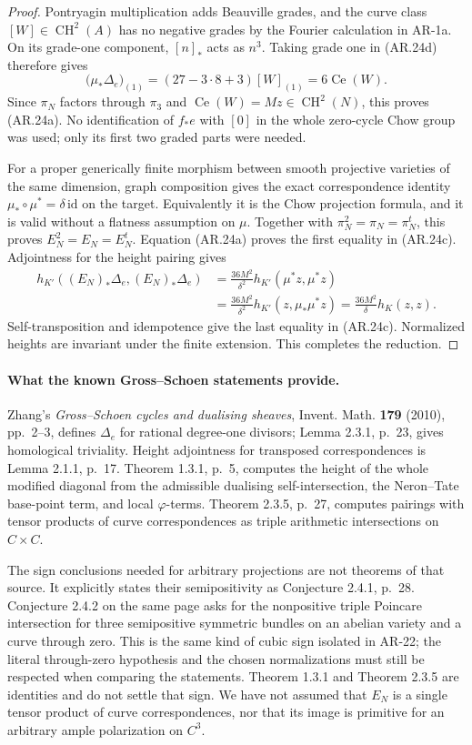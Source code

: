 \documentclass[11pt,a4paper]{article}
\begin{document}
\begin{proof}
Pontryagin multiplication adds Beauville grades, and the curve
class $[W]\in\operatorname{CH}^2(A)$ has no negative grades by
the Fourier calculation in AR-1a.  On its grade-one component,
$[n]_*$ acts as $n^3$.  Taking grade one in (AR.24d) therefore
gives
\[
 \bigl(\mu_*\Delta_e\bigr)_{(1)}
       =(27-3\cdot8+3)[W]_{(1)}=6\operatorname{Ce}(W).
\]
Since $\pi_N$ factors through $\pi_3$ and
$\operatorname{Ce}(W)=Mz\in\operatorname{CH}^2(N)$, this proves
(AR.24a).  No identification of $f_*e$ with $[0]$ in the whole
zero-cycle Chow group was used; only its first two graded parts
were needed.

For a proper generically finite morphism between smooth projective
varieties of the same dimension, graph composition gives the exact
correspondence identity
$\mu_*\circ\mu^*=\delta\,\mathrm{id}$ on the target.  Equivalently
it is the Chow projection formula, and it is valid without a
flatness assumption on $\mu$.  Together with
$\pi_N^2=\pi_N=\pi_N^t$, this proves
$E_N^2=E_N=E_N^t$.  Equation (AR.24a) proves the first equality in
(AR.24c).  Adjointness for the height pairing gives
\[
 \begin{split}
 h_{K'}((E_N)_*\Delta_e,(E_N)_*\Delta_e)
 &=\frac{36M^2}{\delta^2}
       h_{K'}(\mu^*z,\mu^*z)\\
 &=\frac{36M^2}{\delta^2}
       h_{K'}(z,\mu_*\mu^*z)
  =\frac{36M^2}{\delta}h_K(z,z).
 \end{split}
\]
Self-transposition and idempotence give the last equality in
(AR.24c).  Normalized heights are invariant under the finite
extension.  This completes the reduction.
\end{proof}

\paragraph{What the known Gross--Schoen statements provide.}
Zhang's \emph{Gross--Schoen cycles and dualising sheaves}, Invent.
Math. \textbf{179} (2010), pp.~2--3, defines $\Delta_e$ for rational
degree-one divisors; Lemma 2.3.1, p.~23, gives homological
triviality.  Height adjointness for transposed correspondences is
Lemma 2.1.1, p.~17.  Theorem 1.3.1, p.~5, computes the height of
the whole modified diagonal from the admissible dualising
self-intersection, the Neron--Tate base-point term, and local
$\varphi$-terms.  Theorem 2.3.5, p.~27, computes pairings with
tensor products of curve correspondences as triple arithmetic
intersections on $C\times C$.

The sign conclusions needed for arbitrary projections are not
theorems of that source.  It explicitly states their semipositivity
as Conjecture 2.4.1, p.~28.  Conjecture 2.4.2 on the same page
asks for the nonpositive triple Poincare intersection for three
semipositive symmetric bundles on an abelian variety and a curve
through zero.  This is the same kind of cubic sign isolated in
AR-22; the literal through-zero hypothesis and the chosen
normalizations must still be respected when comparing the
statements.  Theorem 1.3.1 and Theorem 2.3.5 are identities and do
not settle that sign.  We have not assumed that $E_N$ is a single
tensor product of curve correspondences, nor that its image is
primitive for an arbitrary ample polarization on $C^3$.
\end{document}
